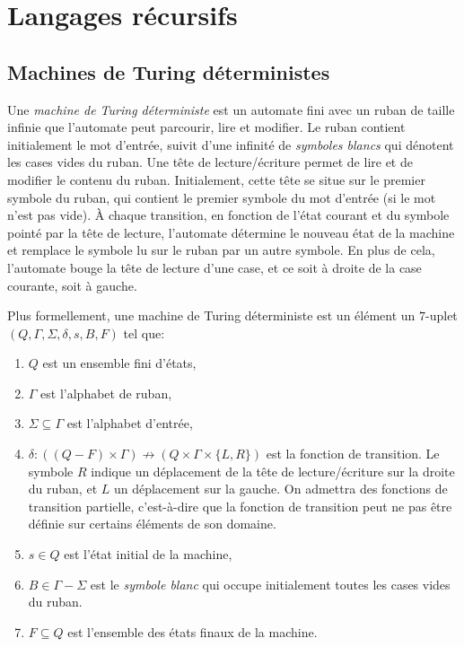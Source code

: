 \chapter{Langages récursifs}

\section{Machines de Turing déterministes}

Une \og \textit{machine de Turing déterministe} \fg{} est un automate fini avec un ruban de taille infinie que l'automate peut parcourir, lire et modifier.
Le ruban contient initialement le mot d'entrée, suivit d'une infinité de \textit{symboles blancs} qui dénotent les cases vides du ruban.
Une tête de lecture/écriture permet de lire et de modifier le contenu du ruban.
Initialement, cette tête se situe sur le premier symbole du ruban, qui contient le premier symbole du mot d'entrée (si le mot n'est pas vide).
À chaque transition, en fonction de l'état courant et du symbole pointé par la tête de lecture, l'automate détermine le nouveau état de la machine et remplace le symbole lu sur le ruban par un autre symbole.
En plus de cela, l'automate bouge la tête de lecture d'une case, et ce soit à droite de la case courante, soit à gauche.

Plus formellement, une machine de Turing déterministe est un élément un $7$-uplet $(Q, \Gamma, \Sigma, \delta, s, B, F)$ tel que:
\begin{enumerate}
\item
$Q$ est un ensemble fini d'états,
\item
$\Gamma$ est l'alphabet de ruban,
\item
$\Sigma \subseteq \Gamma$ est l'alphabet d'entrée,
\item
$\delta : ((Q - F) \times \Gamma) \not\to (Q \times \Gamma \times \{L, R\})$ est la fonction de transition. Le symbole $R$ indique un déplacement de la tête de lecture/écriture sur la droite du ruban, et $L$ un déplacement sur la gauche.
On admettra des fonctions de transition partielle, c'est-à-dire que la fonction de transition peut ne pas être définie sur certains éléments de son domaine. 
\item
$s \in Q$ est l'état initial de la machine,
\item
$B \in \Gamma - \Sigma$ est le \og \textit{symbole blanc} \fg{} qui occupe initialement toutes les cases vides du ruban.
\item
$F \subseteq Q$ est l'ensemble des états finaux de la machine.
\end{enumerate}

